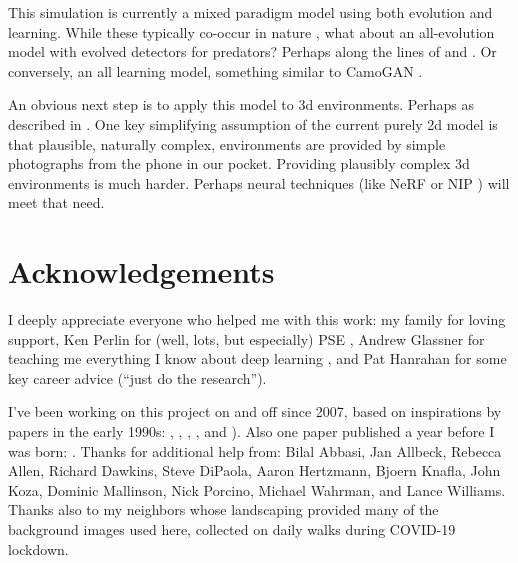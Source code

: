 \documentclass[letterpaper]{article}
\begin{document}
\par
This simulation is currently a mixed paradigm model using both evolution and learning. While these typically co-occur in nature \citep{valiant_probably_2013}, what about an all-evolution model with evolved detectors for predators? Perhaps along the lines of \citet{harrington_coevolution_2014} and \citet{bi_genetic_2022}. Or conversely, an all learning model, something similar to CamoGAN \citep{talas_camogan_2020}.
\par
An obvious next step is to apply this model to 3d environments. Perhaps as described in \citet{miller_color_2022}. One key simplifying assumption of the current purely 2d model is that plausible, naturally complex, environments are provided by simple photographs from the phone in our pocket. Providing plausibly complex 3d environments is much harder. Perhaps neural techniques (like NeRF \citep{gao_nerf_2022} or NIP \citep{sharp_spelunking_2022}) will meet that need.
\par



\section{Acknowledgements}
I deeply appreciate everyone who helped me with this work: my family for loving support, Ken Perlin for (well, lots, but especially) PSE \citep{perlin_image_1985}, Andrew Glassner for teaching me everything I know about deep learning \citep{glassner_deep_2021}, and Pat Hanrahan for some key career advice (“just do the research”).
\par
I've been working on this project on and off since 2007, based on inspirations by papers in the early 1990s: \citet{witkin_reaction_1991}, \citet{turk_generating_1991}, \citet{angeline_competitive_1993}, \citet{sims_artificial_1991}, and \citet{sims_evolving_1994}). Also one paper published a year before I was born: \citet{turing_chemical_1952}.
Thanks for additional help from:
Bilal Abbasi,
Jan Allbeck,
Rebecca Allen,
Richard Dawkins,
Steve DiPaola,
Aaron Hertzmann,
Bjoern Knafla,
John Koza,
Dominic Mallinson,
Nick Porcino,
Michael Wahrman,
and Lance Williams.
Thanks also to my neighbors whose landscaping provided many of the background images used here, collected on daily walks during COVID-19 lockdown.
\par
\end{document}
